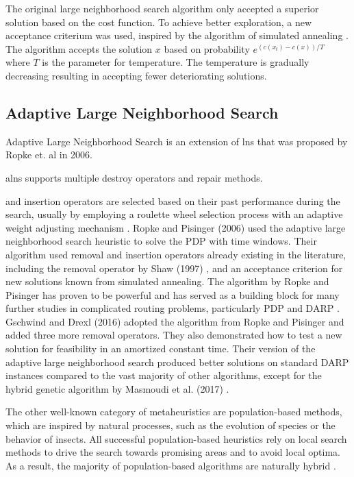 The original large neighborhood search algorithm only accepted a superior solution based on the cost function. To achieve better exploration, a new acceptance criterium was used, inspired by the algorithm of simulated annealing \cite{lns-anneling}. The algorithm accepts the solution $x$ based on probability $e^{(c(x_t) - c(x))/T}$ where $T$ is the parameter for temperature. The temperature is gradually decreasing resulting in accepting fewer deteriorating solutions.

\subsection{Adaptive Large Neighborhood Search}
Adaptive Large Neighborhood Search is an extension of \gls{lns} that was proposed by Ropke et. al \cite{alns} in 2006.

\gls{alns} supports multiple destroy operators and repair methods.

and insertion operators are selected based on their past performance during the search, usually by employing a roulette wheel selection process with an adaptive weight adjusting mechanism \cite{Azi2014, Gschwind2016, Masmoudi2020}. Ropke and Pisinger (2006) \cite{Ropke2006} used the adaptive large neighborhood search heuristic to solve the PDP with time windows. Their algorithm used removal and insertion operators already existing in the literature, including the removal operator by Shaw (1997) \cite{Shaw1997}, and an acceptance criterion for new solutions known from simulated annealing. The algorithm by Ropke and Pisinger has proven to be powerful and has served as a building block for many further studies in complicated routing problems, particularly PDP and DARP \cite{Gschwind2016, Braekers2016, Masmoudi2016, Belhaiza2017, Drexl2018, Belhaiza2019, Masmoudi2020, Wang2020, Cauchi2020, Malheiros2021}. Gschwind and Drexl (2016) \cite{Gschwind2016} adopted the algorithm from Ropke and Pisinger and added three more removal operators. They also demonstrated how to test a new solution for feasibility in an amortized constant time. Their version of the adaptive large neighborhood search produced better solutions on standard DARP instances compared to the vast majority of other algorithms, except for the hybrid genetic algorithm by Masmoudi et al. (2017) \cite{Masmoudi2017}.
\vspace{0.5cm}

The other well-known category of metaheuristics are population-based methods, which are inspired by natural processes, such as the evolution of species or the behavior of insects. All successful population-based heuristics rely on local search methods to drive the search towards promising areas and to avoid local optima. As a result, the majority of population-based algorithms are naturally hybrid \cite{toth2015vrp}.


